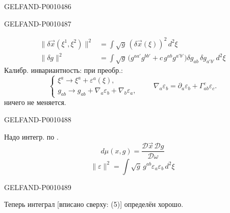 \begin{GelfandAdjacentEvidence}{GELFAND-P001048}{6}

\end{GelfandAdjacentEvidence}
\begin{GelfandAdjacentEvidence}{GELFAND-P001048}{7}

\begin{equation*}
\begin{aligned}
\|\delta\vec{x}(\xi^1,\xi^2)\|^2
&=\int\sqrt{g}\,(\delta\vec{x}(\xi))^2\,d^2\xi\\
\|\delta g\|^2
&=\int\sqrt{g}\,
\bigl(g^{aa'}g^{bb'}+c\,g^{ab}g^{a'b'}\bigr)
\delta g_{ab}\,\delta g_{a'b'}\,d^2\xi
\end{aligned}
\tag{6}
\end{equation*}
Калибр. инвариантность: при преобр.:
\begin{equation*}
\begin{cases}
\xi^a\to\xi^a+\varepsilon^a(\xi),\\
g_{ab}\to g_{ab}+\nabla_a\varepsilon_b+\nabla_b\varepsilon_a,
\end{cases}
\qquad
\nabla_a\varepsilon_b=\partial_a\varepsilon_b+\Gamma_{ab}^{c}\varepsilon_c.
\tag{7}
\end{equation*}
ничего не меняется.
\end{GelfandAdjacentEvidence}
\begin{GelfandAdjacentEvidence}{GELFAND-P001048}{8}


Надо интегр. по .
\begin{equation*}
d\mu(x,g)=\frac{\mathcal{D}\vec{x}\,\mathcal{D}g}{\mathcal{D}\omega}
\tag{8}
\end{equation*}
\begin{equation*}
\|\varepsilon\|^2=\int\sqrt{g}\,g^{ab}\varepsilon_a\varepsilon_b\,d^2\xi
\tag{9}
\end{equation*}
\end{GelfandAdjacentEvidence}
\begin{GelfandAdjacentEvidence}{GELFAND-P001048}{9}


Теперь интеграл [вписано сверху: (5)] определён хорошо.
\end{GelfandAdjacentEvidence}
